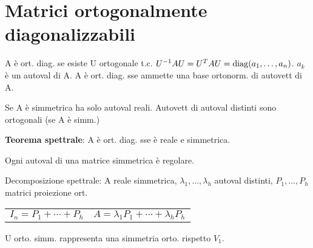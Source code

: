 \section{Matrici ortogonalmente diagonalizzabili}

A è ort. diag. se esiste U ortogonale t.c. $U^{-1}AU = U^TAU = \mathrm{diag}(a_1, \dots, a_n)$. $a_k$ è un autoval di A.
A è ort. diag. sse ammette una base ortonorm. di autovett di A.

Se A è simmetrica ha solo autoval reali. Autovett di autoval distinti sono ortogonali (se A è simm.)

\textbf{Teorema spettrale}: A è ort. diag. sse è reale e simmetrica.

Ogni autoval di una matrice simmetrica è regolare.

Decomposizione spettrale: A reale simmetrica, $\lambda_1, \dots, \lambda_h$ autoval distinti, $P_1, \dots, P_h$ matrici proiezione ort.
\begin{tabular}{ll}
	$I_n = P_1 + \cdots + P_h$ & $A = \lambda_1P_1 + \cdots + \lambda_hP_h$
\end{tabular}

U orto. simm. rappresenta una simmetria orto. rispetto $V_1$.
